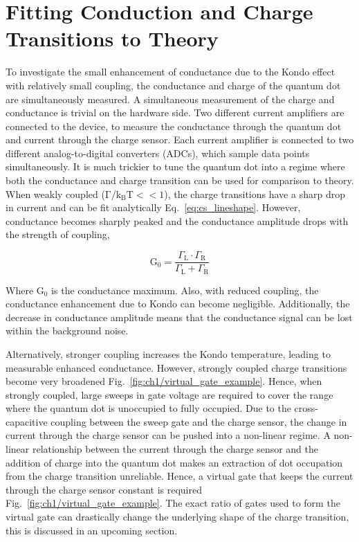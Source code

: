 \section{Fitting Conduction and Charge Transitions to Theory}
To investigate the small enhancement of conductance due to the Kondo effect with relatively small coupling, the conductance and charge of the quantum dot are simultaneously measured. A simultaneous measurement of the charge and conductance is trivial on the hardware side. Two different current amplifiers are connected to the device, to measure the conductance through the quantum dot and current through the charge sensor. Each current amplifier is connected to two different analog-to-digital converters (ADCs), which sample data points simultaneously. It is much trickier to tune the quantum dot into a regime where both the conductance and charge transition can be used for comparison to theory. When weakly coupled ($\mathrm{\Gamma/k_BT}<<1$), the charge transitions have a sharp drop in current and can be fit analytically Eq.~\ref{eq:cs_lineshape}. However, conductance becomes sharply peaked and the conductance amplitude drops with the strength of coupling, 

\begin{equation}\label{eq:cond_amp}
 \mathrm{G_0} = 
 \frac
 {\Gamma_\mathrm{L}\cdot\Gamma_\mathrm{R}}
 {\Gamma_\mathrm{L} + \Gamma_\mathrm{R}}
\end{equation}

Where $\mathrm{G_0}$ is the conductance maximum. Also, with reduced coupling, the conductance enhancement due to Kondo can become negligible. Additionally, the decrease in conductance amplitude means that the conductance signal can be lost within the background noise.


Alternatively, stronger coupling increases the Kondo temperature, leading to measurable enhanced conductance. However, strongly coupled charge transitions become very broadened Fig.~\ref{fig:ch1/virtual_gate_example}. Hence, when strongly coupled, large sweeps in gate voltage are required to cover the range where the quantum dot is unoccupied to fully occupied. Due to the cross-capacitive coupling between the sweep gate and the charge sensor, the change in current through the charge sensor can be pushed into a non-linear regime. A non-linear relationship between the current through the charge sensor and the addition of charge into the quantum dot makes an extraction of dot occupation from the charge transition unreliable. Hence, a virtual gate that keeps the current through the charge sensor constant is required Fig.~\ref{fig:ch1/virtual_gate_example}. The exact ratio of gates used to form the virtual gate can drastically change the underlying shape of the charge transition, this is discussed in an upcoming section. 


